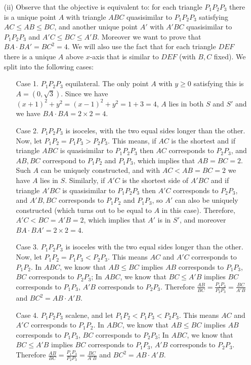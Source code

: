 \documentclass[11pt,a4paper]{article}
\begin{document}
\begin{itemize}
\begin{itemize}
\item[(ii)] Observe that the objective is equivalent to: 
for each triangle $P_1P_2P_3$ there is a unique point $A$ with triangle $ABC$ quasisimilar to $P_1P_2P_3$ satisfying $AC\le AB\le BC$, 
and another unique point $A'$ with $A'BC$ quasisimilar to $P_1P_2P_3$ and $A'C\le BC\le A'B$. 
Moreover we want to prove that $BA\cdot BA'=BC^2=4$. 
We will also use the fact that for each triangle $DEF$ there is a unique $A$ above $x$-axis that is similar to $DEF$ (with $B, C$ fixed). 
We split into the following cases: 
\begin{itemize}
\item [Case 1.] $P_1P_2P_3$ equilateral. The only point $A$ with $y\ge 0$ satisfying this is 
$A=(0, \sqrt{3})$. 
Since we have $(x+1)^2+y^2=(x-1)^2+y^2=1+3=4$, $A$ lies in both $S$ and $S'$ and we have $BA\cdot BA=2\times 2=4$. 
\item [Case 2.] $P_1P_2P_3$ is isoceles, with the two equal sides longer than the other. 
Now, let $P_1P_2=P_1P_3>P_2P_3$. 
This means, if $AC$ is the shortest and if triangle $ABC$ is quasisimilar to $P_1P_2P_3$ then $AC$ corresponds to $P_2P_3$, 
and $AB, BC$ correspond to $P_1P_2$ and $P_1P_3$, which implies that 
$AB=BC=2$. 
Such $A$ can be uniquely constructed, and with $AC < AB=BC=2$ we have $A$ lies in $S$. 
Similarly, if $A'C$ is the shortest side of $A'BC$ and if triangle $A'BC$ is quasisimilar to $P_1P_2P_3$ then $A'C$ corresponds to $P_2P_3$, and $A'B, BC$ corresponds to $P_1P_2$ and $P_1P_3$, so 
$A'$ can also be uniquely constructed (which turns out to be equal to $A$ in this case). 
Therefore, $A'C < BC=A'B=2$, which implies that $A'$ is in $S'$, and moreover $BA\cdot BA'=2\times 2=4$. 

\item [Case 3.] $P_1P_2P_3$ is isoceles with the two equal sides longer than the other. 
Now, let $P_1P_2=P_1P_3<P_2P_3$. 
This means $AC$ and $A'C$ corresponds to $P_1P_2$. 
In $ABC$, we know that $AB\le BC$ implies $AB$ corresponds to $P_1P_3$, $BC$ corresponds to $P_2P_3$;
In $ABC$, we know that $BC\le A'B$ implies $BC$ corresponds to $P_1P_3$, $A'B$ corresponds to $P_2P_3$. 
Therefore $\frac{AB}{BC}=\frac{P_1P_3}{P_2P_3}=\frac{BC}{A'B}$ and $BC^2=AB\cdot A'B$. 

\item [Case 4.] $P_1P_2P_3$ scalene, and let $P_1P_2<P_1P_3<P_2P_3$. 
This means $AC$ and $A'C$ corresponds to $P_1P_2$. 
In $ABC$, we know that $AB\le BC$ implies $AB$ corresponds to $P_1P_3$, $BC$ corresponds to $P_2P_3$;
In $ABC$, we know that $BC\le A'B$ implies $BC$ corresponds to $P_1P_3$, $A'B$ corresponds to $P_2P_3$. 
Therefore $\frac{AB}{BC}=\frac{P_1P_3}{P_2P_3}=\frac{BC}{A'B}$ and $BC^2=AB\cdot A'B$. 
\end{itemize}
\end{itemize}


\end{itemize}
\end{document}
